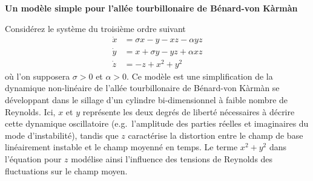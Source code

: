 \documentclass[12pt]{exam}
\begin{document}
\begin{questions}
  \addpoints

  \bigskip
  
  \question[10] \textbf{Un modèle simple pour l'allée tourbillonaire de Bénard-von Kàrmàn}
  \noaddpoints

  Considérez le système du troisième ordre suivant
  \[
  \begin{aligned}
    \dot{x} & = \sigma x - y - xz - \alpha yz \\
    \dot{y} & = x + \sigma y - yz + \alpha xz \\
    \dot{z} & = -z + x^2 + y^2
  \end{aligned}
  \]
  où l'on supposera $\sigma > 0$ et $\alpha > 0$.
  Ce modèle est une simplification de la dynamique non-linéaire de l'allée tourbillonaire de Bénard-von Kàrmàn se développant dans le sillage d'un cylindre bi-dimensionnel à faible nombre de Reynolds.
  Ici, $x$ et $y$ représente les deux degrés de liberté nécessaires à décrire cette dynamique oscillatoire (e.g.\ l'amplitude des parties réelles et imaginaires du mode d'instabilité), tandis que $z$ caractérise la distortion entre le champ de base linéairement instable et le champ moyenné en temps.
  Le terme $x^2 + y^2$ dans l'équation pour $z$ modélise ainsi l'influence des tensions de Reynolds des fluctuations sur le champ moyen.

\end{questions}
\end{document}
